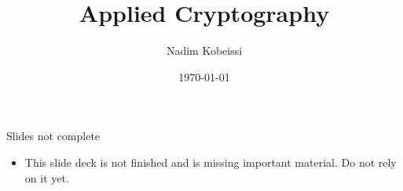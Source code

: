 \documentclass[aspectratio=169, lualatex, handout]{beamer}
\title{Applied Cryptography}
\author{Nadim Kobeissi}
\institute{American University of Beirut}
\date{\today}
\begin{document}
\begin{frame}[plain]
	\titlepage
\end{frame}

\begin{frame}{Slides not complete}
	\begin{itemize}
		\item This slide deck is not finished and is missing important material. Do not rely on it yet.
	\end{itemize}
\end{frame}

\begin{frame}[plain]
	\titlepage
\end{frame}
\end{document}
